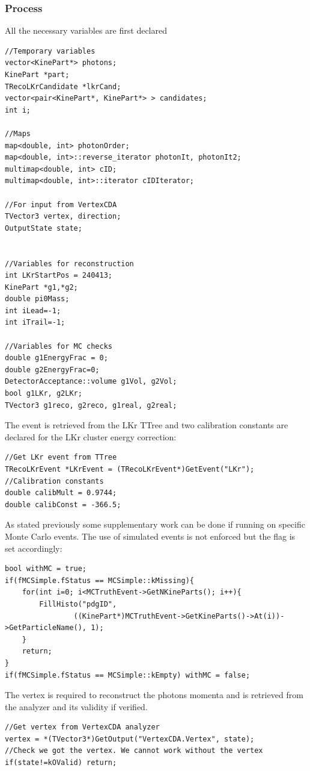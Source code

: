\subsubsection{Process}
All the necessary variables are first declared
\begin{lstlisting}
//Temporary variables
vector<KinePart*> photons;
KinePart *part;
TRecoLKrCandidate *lkrCand;
vector<pair<KinePart*, KinePart*> > candidates;
int i;

//Maps
map<double, int> photonOrder;
map<double, int>::reverse_iterator photonIt, photonIt2;
multimap<double, int> cID;
multimap<double, int>::iterator cIDIterator;

//For input from VertexCDA
TVector3 vertex, direction;
OutputState state;


//Variables for reconstruction
int LKrStartPos = 240413;
KinePart *g1,*g2;
double pi0Mass;
int iLead=-1;
int iTrail=-1;

//Variables for MC checks
double g1EnergyFrac = 0;
double g2EnergyFrac=0;
DetectorAcceptance::volume g1Vol, g2Vol;
bool g1LKr, g2LKr;
TVector3 g1reco, g2reco, g1real, g2real;
\end{lstlisting}

The event is retrieved from the LKr TTree and two calibration constants are declared for the LKr
cluster energy correction:
\begin{lstlisting}
//Get LKr event from TTree
TRecoLKrEvent *LKrEvent = (TRecoLKrEvent*)GetEvent("LKr");
//Calibration constants
double calibMult = 0.9744;
double calibConst = -366.5;
\end{lstlisting}

As stated previously some supplementary work can be done if running on specific Monte Carlo events.
The use of simulated events is not enforced but the  flag is set accordingly:
\begin{lstlisting}
bool withMC = true;
if(fMCSimple.fStatus == MCSimple::kMissing){
	for(int i=0; i<MCTruthEvent->GetNKineParts(); i++){
		FillHisto("pdgID", 
				((KinePart*)MCTruthEvent->GetKineParts()->At(i))->GetParticleName(), 1);
	}
	return;
}
if(fMCSimple.fStatus == MCSimple::kEmpty) withMC = false;
\end{lstlisting}

The vertex is required to reconstruct the photons momenta and is retrieved from the
 analyzer and its validity if verified.
\begin{lstlisting}
//Get vertex from VertexCDA analyzer
vertex = *(TVector3*)GetOutput("VertexCDA.Vertex", state);
//Check we got the vertex. We cannot work without the vertex
if(state!=kOValid) return;
\end{lstlisting}

